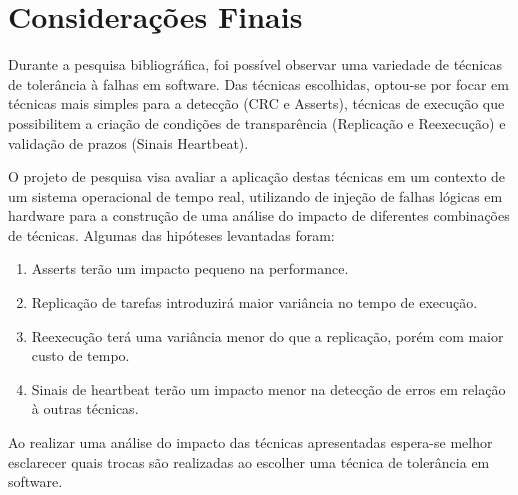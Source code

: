 \chapter{Considerações Finais}
\label{cap:consid}

Durante a pesquisa bibliográfica, foi possível observar uma variedade de técnicas de tolerância à falhas em software. Das técnicas escolhidas, optou-se por focar em técnicas mais simples para a detecção (CRC e Asserts), técnicas de execução que possibilitem a criação de condições de transparência (Replicação e Reexecução) e validação de prazos (Sinais Heartbeat).

O projeto de pesquisa visa avaliar a aplicação destas técnicas em um contexto de um sistema operacional de tempo real, utilizando de injeção de falhas lógicas em hardware para a construção de uma análise do impacto de diferentes combinações de técnicas. Algumas das hipóteses levantadas foram:

\begin{enumerate}
    \item Asserts terão um impacto pequeno na performance.
    \item Replicação de tarefas introduzirá maior variância no tempo de execução.
    \item Reexecução terá uma variância menor do que a replicação, porém com maior custo de tempo.
    \item Sinais de heartbeat terão um impacto menor na detecção de erros em relação à outras técnicas.
\end{enumerate}

Ao realizar uma análise do impacto das técnicas apresentadas espera-se melhor esclarecer quais trocas são realizadas ao escolher uma técnica de tolerância em software.
